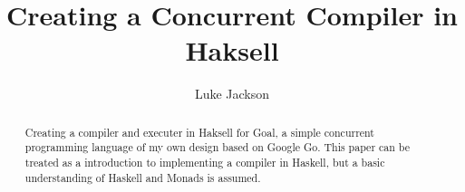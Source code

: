 \documentclass{report}
\author{Luke Jackson}
\title{Creating a Concurrent Compiler in Haksell}
\begin{document}
\maketitle

\begin{abstract}
Creating a compiler and executer in Haksell for Goal, a simple concurrent programming language of my own design based on Google Go. This paper can be treated as a introduction to implementing a compiler in Haskell, but a basic understanding of Haskell and Monads is assumed.
\end{abstract}

\tableofcontents











\end{document}
